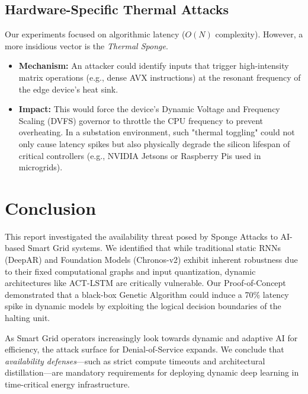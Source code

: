\documentclass[conference]{IEEEtran}
\begin{document}
\subsection{Hardware-Specific Thermal Attacks}
Our experiments focused on algorithmic latency ($O(N)$ complexity). However, a more insidious vector is the \textit{Thermal Sponge}.
\begin{itemize}
    \item \textbf{Mechanism:} An attacker could identify inputs that trigger high-intensity matrix operations (e.g., dense AVX instructions) at the resonant frequency of the edge device's heat sink.
    \item \textbf{Impact:} This would force the device's Dynamic Voltage and Frequency Scaling (DVFS) governor to throttle the CPU frequency to prevent overheating. In a substation environment, such "thermal toggling" could not only cause latency spikes but also physically degrade the silicon lifespan of critical controllers (e.g., NVIDIA Jetsons or Raspberry Pis used in microgrids).
\end{itemize}

\section{Conclusion}
This report investigated the availability threat posed by Sponge Attacks to AI-based Smart Grid systems. We identified that while traditional static RNNs (DeepAR) and Foundation Models (Chronos-v2) exhibit inherent robustness due to their fixed computational graphs and input quantization, dynamic architectures like ACT-LSTM are critically vulnerable. Our Proof-of-Concept demonstrated that a black-box Genetic Algorithm could induce a 70\% latency spike in dynamic models by exploiting the logical decision boundaries of the halting unit.

As Smart Grid operators increasingly look towards dynamic and adaptive AI for efficiency, the attack surface for Denial-of-Service expands. We conclude that \textit{availability defenses}—such as strict compute timeouts and architectural distillation—are mandatory requirements for deploying dynamic deep learning in time-critical energy infrastructure.
\end{document}
